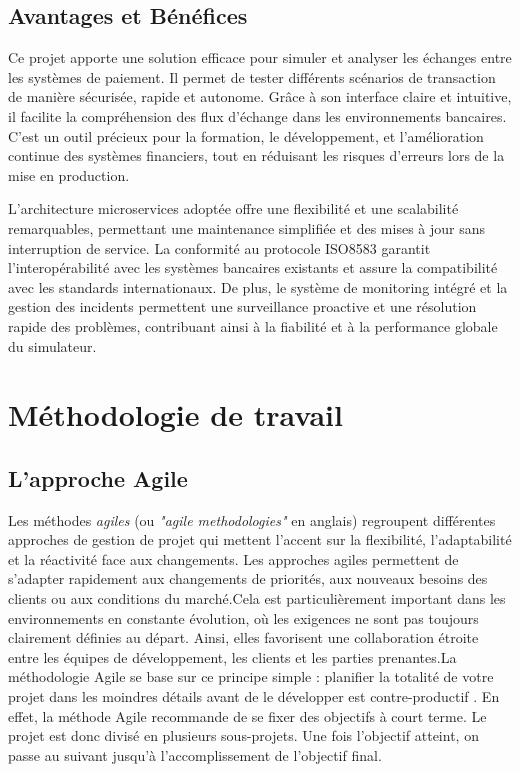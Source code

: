 \subsection{Avantages et Bénéfices}

Ce projet apporte une solution efficace pour simuler et analyser les échanges entre les systèmes de paiement. Il permet de tester différents scénarios de transaction de manière sécurisée, rapide et autonome. Grâce à son interface claire et intuitive, il facilite la compréhension des flux d'échange dans les environnements bancaires. C'est un outil précieux pour la formation, le développement, et l'amélioration continue des systèmes financiers, tout en réduisant les risques d'erreurs lors de la mise en production.

L'architecture microservices adoptée offre une flexibilité et une scalabilité remarquables, permettant une maintenance simplifiée et des mises à jour sans interruption de service. La conformité au protocole ISO8583 garantit l'interopérabilité avec les systèmes bancaires existants et assure la compatibilité avec les standards internationaux. De plus, le système de monitoring intégré et la gestion des incidents permettent une surveillance proactive et une résolution rapide des problèmes, contribuant ainsi à la fiabilité et à la performance globale du simulateur.



\section{Méthodologie de travail }
\subsection{L’approche Agile}

Les méthodes \textit{agiles} (ou \textit{"agile methodologies"} en anglais) regroupent différentes approches de gestion de projet qui mettent l'accent sur la flexibilité, l'adaptabilité et la réactivité face aux changements. Les approches agiles permettent de s'adapter rapidement aux changements de priorités, aux nouveaux besoins des clients ou aux conditions du marché.Cela est particulièrement important dans les environnements en constante évolution, où les exigences ne sont pas toujours clairement définies au départ. Ainsi, elles favorisent une collaboration étroite entre les équipes de développement, les clients et les parties prenantes.La méthodologie Agile se base sur ce principe simple : \og planifier la totalité de votre projet dans les moindres détails avant de le développer est contre-productif \fg. En effet, la méthode Agile recommande de se fixer des objectifs à court terme. Le projet est donc divisé en plusieurs sous-projets. Une fois l’objectif atteint, on passe au suivant jusqu’à l’accomplissement de l’objectif final. 


